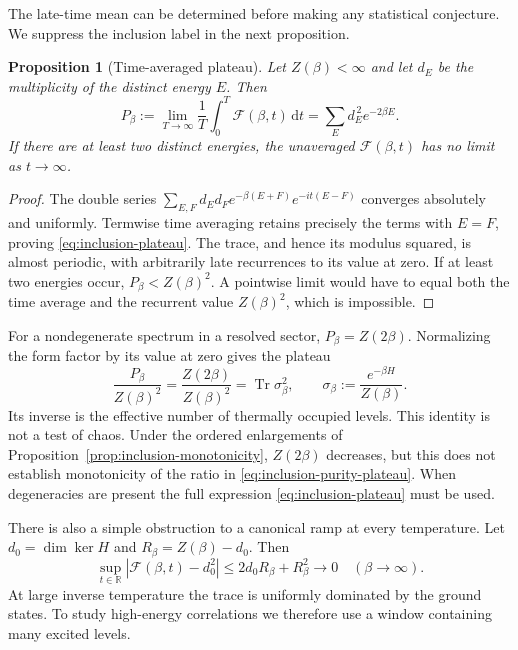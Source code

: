 \documentclass[a4paper,11pt]{article}
\newtheorem{proposition}[theorem]{Proposition}
\theoremstyle{definition}
\begin{document}
The late-time mean can be determined before making any statistical conjecture. We suppress the inclusion label in the next proposition.

\begin{proposition}[Time-averaged plateau]\label{prop:inclusion-plateau}
Let $Z(\beta)<\infty$ and let $d_E$ be the multiplicity of the distinct energy $E$. Then
\begin{equation}
 P_\beta:=\lim_{T\to\infty}\frac1T\int_0^T\mathcal F(\beta,t)\,\mathrm dt
   =\sum_E d_E^{\,2}e^{-2\beta E}.
 \label{eq:inclusion-plateau}
\end{equation}
If there are at least two distinct energies, the unaveraged $\mathcal F(\beta,t)$ has no limit as $t\to\infty$.
\end{proposition}
\begin{proof}
The double series
$\sum_{E,F}d_Ed_F e^{-\beta(E+F)}e^{-it(E-F)}$
converges absolutely and uniformly. Termwise time averaging retains precisely the terms with $E=F$, proving \eqref{eq:inclusion-plateau}. The trace, and hence its modulus squared, is almost periodic, with arbitrarily late recurrences to its value at zero. If at least two energies occur, $P_\beta<Z(\beta)^2$. A pointwise limit would have to equal both the time average and the recurrent value $Z(\beta)^2$, which is impossible.
\end{proof}

For a nondegenerate spectrum in a resolved sector, $P_\beta=Z(2\beta)$. Normalizing the form factor by its value at zero gives the plateau
\begin{equation}
 \frac{P_\beta}{Z(\beta)^2}
   =\frac{Z(2\beta)}{Z(\beta)^2}
   =\operatorname{Tr}\sigma_\beta^2,
 \qquad
 \sigma_\beta:=\frac{e^{-\beta H}}{Z(\beta)}.
 \label{eq:inclusion-purity-plateau}
\end{equation}
Its inverse is the effective number of thermally occupied levels. This identity is not a test of chaos. Under the ordered enlargements of Proposition~\ref{prop:inclusion-monotonicity}, $Z(2\beta)$ decreases, but this does not establish monotonicity of the ratio in \eqref{eq:inclusion-purity-plateau}. When degeneracies are present the full expression \eqref{eq:inclusion-plateau} must be used.

There is also a simple obstruction to a canonical ramp at every temperature. Let $d_0=\dim\ker H$ and $R_\beta=Z(\beta)-d_0$. Then
\begin{equation}
 \sup_{t\in\mathbb R}|\mathcal F(\beta,t)-d_0^2|
   \le 2d_0R_\beta+R_\beta^2
   \longrightarrow0\quad(\beta\to\infty).
 \label{eq:inclusion-vacuum-bound}
\end{equation}
At large inverse temperature the trace is uniformly dominated by the ground states. To study high-energy correlations we therefore use a window containing many excited levels.
\end{document}
